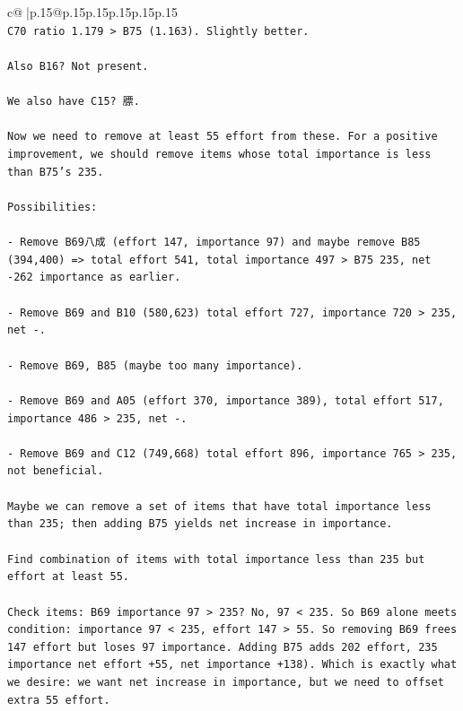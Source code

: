 \documentclass{article}
\begin{document}
{\begin{supertabular}{c@{$\;$}|p{.15\linewidth}@{}p{.15\linewidth}p{.15\linewidth}p{.15\linewidth}p{.15\linewidth}p{.15\linewidth}}
{{{\\ 
\texttt{C70 ratio 1.179 > B75 (1.163). Slightly better.} \\
\\ 
\texttt{Also B16? Not present.} \\
\\ 
\texttt{We also have C15? 膘.} \\
\\ 
\texttt{Now we need to remove at least 55 effort from these. For a positive improvement, we should remove items whose total importance is less than B75's 235.} \\
\\ 
\texttt{Possibilities:} \\
\\ 
\texttt{{-} Remove B69八成 (effort 147, importance 97) and maybe remove B85 (394,400) => total effort 541, total importance 497 > B75 235, net {-}262 importance as earlier.} \\
\\ 
\texttt{{-} Remove B69 and B10 (580,623) total effort 727, importance 720 > 235, net {-}.} \\
\\ 
\texttt{{-} Remove B69, B85 (maybe too many importance).} \\
\\ 
\texttt{{-} Remove B69 and A05 (effort 370, importance 389), total effort 517, importance 486 > 235, net {-}.} \\
\\ 
\texttt{{-} Remove B69 and C12 (749,668) total effort 896, importance 765 > 235, not beneficial.} \\
\\ 
\texttt{Maybe we can remove a set of items that have total importance less than 235; then adding B75 yields net increase in importance.} \\
\\ 
\texttt{Find combination of items with total importance less than 235 but effort at least 55.} \\
\\ 
\texttt{Check items: B69 importance 97 > 235? No, 97 < 235. So B69 alone meets condition: importance 97 < 235, effort 147 > 55. So removing B69 frees 147 effort but loses 97 importance. Adding B75 adds 202 effort, 235 importance net effort +55, net importance +138). Which is exactly what we desire: we want net increase in importance, but we need to offset extra 55 effort.} \\
\\ 
}}}
\end{supertabular}}
\end{document}
